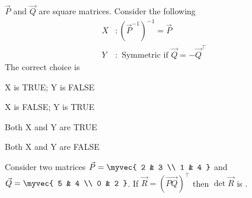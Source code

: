 \item $\vec{P}$ and $\vec{Q}$ are square matrices. Consider the following
\begin{align}
	X&: (\vec{P}^{-1})^{-1} = \vec{P}\\
	Y&: \text{ Symmetric if }\vec{Q} = -\vec{Q}^{\top}
\end{align}
The correct choice is
\hfill{}
\begin{enumerate}
\begin{multicols}{2}
\item X is TRUE; Y is FALSE
\item X is FALSE; Y is TRUE
\item Both X and Y are TRUE
\item Both X and Y are FALSE
\end{multicols}
\end{enumerate}
\item Consider two matrices $\vec{P} = \myvec{ 2 & 3 \\ 1 & 4 }$ and $\vec{Q} = \myvec{ 5 & 4 \\ 0 & 2 }$. If $\vec{R} = (\vec{PQ})^{\top}$ then $\det \vec{R}$ is \underline{\hspace{2cm}}. \hfill{}
